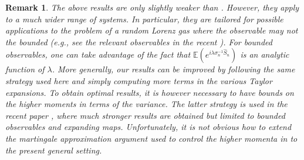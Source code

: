 \documentclass{amsart}
\numberwithin{equation}{section}
\newtheorem{rem}[thm]{Remark}
\newcommand\bE{{\mathbb E}}
\begin{document}
\begin{rem}\label{rem:momenta}
The above results are only slightly weaker than \cite{H20}. However, they apply to a much wider range of systems. In particular, they are tailored for possible applications to the problem of a random Lorenz gas where the observable may not the bounded (e.g., see the relevant observables in the recent \cite{DK23}).  For bounded observables, one can take advantage of the fact that 
$\bE \left( e^{i \lambda \sigma_n^{-1} \hat{S}_n} \right)$ 
is an analytic function of $\lambda$. More generally, our results can be improved by following the same strategy used here and simply computing more terms in the various Taylor expansions.
To obtain optimal results, it is however necessary to have bounds on the higher moments in terms of the variance.  The latter strategy is used in the recent paper \cite{DH24}, where much stronger results are obtained but limited to bounded observables and expanding maps. Unfortunately, it is not obvious how to extend the martingale approximation argument used to control the higher momenta in \cite{DH24} to the present general setting.
\end{rem}

\end{document}
